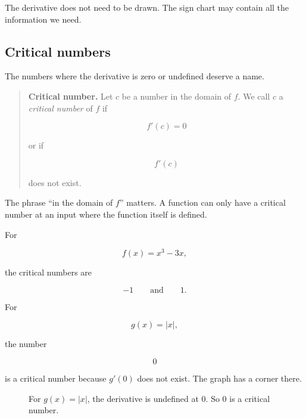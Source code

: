 The derivative does not need to be drawn.  The sign chart may contain all the
information we need.

\subsection{Critical numbers}
\label{subsec:critical-numbers}

The numbers where the derivative is zero or undefined deserve a name.

\begin{quote}
\textbf{Critical number.}
Let \(c\) be a number in the domain of \(f\).  We call \(c\) a \emph{critical number}
of \(f\) if

\[
f'(c)=0
\]

or if

\[
f'(c)
\]

does not exist.
\end{quote}

The phrase ``in the domain of \(f\)'' matters.  A function can only have a critical
number at an input where the function itself is defined.

For

\[
f(x)=x^3-3x,
\]

the critical numbers are

\[
-1
\qquad\text{and}\qquad
1.
\]

For

\[
g(x)=|x|,
\]

the number

\[
0
\]

is a critical number because \(g'(0)\) does not exist.  The graph has a corner there.

\begin{figure}[h]
\centering
{}
\caption{For \(g(x)=|x|\), the derivative is undefined at \(0\).  So \(0\) is a critical number.}
\label{fig:absolute-value-critical}
\end{figure}

